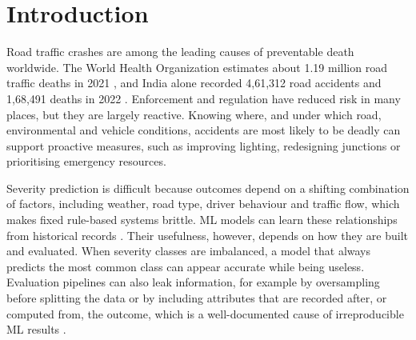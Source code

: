 \documentclass[conference]{IEEEtran}
\begin{document}
\section{Introduction}

Road traffic crashes are among the leading causes of preventable death worldwide. The World Health Organization estimates about 1.19 million road traffic deaths in 2021 \cite{who2023}, and India alone recorded 4,61,312 road accidents and 1,68,491 deaths in 2022 \cite{morth2022}. Enforcement and regulation have reduced risk in many places, but they are largely reactive. Knowing where, and under which road, environmental and vehicle conditions, accidents are most likely to be deadly can support proactive measures, such as improving lighting, redesigning junctions or prioritising emergency resources.

Severity prediction is difficult because outcomes depend on a shifting combination of factors, including weather, road type, driver behaviour and traffic flow, which makes fixed rule-based systems brittle. ML models can learn these relationships from historical records \cite{behboudi2024}. Their usefulness, however, depends on how they are built and evaluated. When severity classes are imbalanced, a model that always predicts the most common class can appear accurate while being useless. Evaluation pipelines can also leak information, for example by oversampling before splitting the data or by including attributes that are recorded after, or computed from, the outcome, which is a well-documented cause of irreproducible ML results \cite{kapoor2023}.
\end{document}
